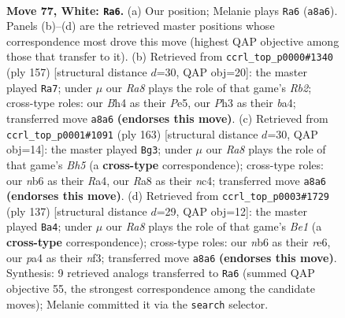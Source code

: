 \documentclass[11pt]{article}
\begin{document}
\clearpage

\begin{figure}[p]\centering
\begin{subfigure}{0.46\textwidth}\centering
\resizebox{\linewidth}{!}{%
\newchessgame
\chessboard[
  setfen={R7/6k1/1n6/3r4/p4P1B/P6P/6K1/8 w - - 9 77},
  showmover=false,
  pgfstyle=straightmove, color=movearrow, markmove={a8-a6}
]}
\caption{}
\end{subfigure}\hfill
\begin{subfigure}{0.46\textwidth}\centering
\resizebox{\linewidth}{!}{%
\newchessgame
\chessboard[
  setfen={7k/1r6/3N4/2p1p3/B1P3pP/6P1/8/7K b - - 0 79},
  showmover=false,
  pgfstyle=straightmove, color=movearrow, markmove={b7-a7}
]}
\caption{}
\end{subfigure}
\\[4pt]
\begin{subfigure}{0.46\textwidth}\centering
\resizebox{\linewidth}{!}{%
\newchessgame
\chessboard[
  setfen={5k2/8/8/3K1p1p/r1N4b/5P2/P6R/8 b - - 1 82},
  showmover=false,
  pgfstyle=straightmove, color=movearrow, markmove={h4-g3}
]}
\caption{}
\end{subfigure}\hfill
\begin{subfigure}{0.46\textwidth}\centering
\resizebox{\linewidth}{!}{%
\newchessgame
\chessboard[
  setfen={1k2b2r/1p5P/4R3/3p4/8/5NK1/8/8 b - - 6 69},
  showmover=false,
  pgfstyle=straightmove, color=movearrow, markmove={e8-a4}
]}
\caption{}
\end{subfigure}
\caption{\textbf{Move 77, White: \texttt{Ra6}.} (a) Our position; Melanie plays \texttt{Ra6} (\texttt{a8a6}). Panels (b)--(d) are the retrieved master positions whose correspondence most drove this move (highest QAP objective among those that transfer to it). (b) Retrieved from \texttt{ccrl\_top\_p0000\#1340} (ply 157) [structural distance $d$=30, QAP obj=20]: the master played \texttt{Ra7}; under $\mu$ our \emph{Ra8} plays the role of that game's \emph{Rb2}; cross-type roles: our \emph{B}h4 as their \emph{P}e5, our \emph{P}h3 as their \emph{b}a4; transferred move \texttt{a8a6} \textbf{(endorses this move)}. (c) Retrieved from \texttt{ccrl\_top\_p0001\#1091} (ply 163) [structural distance $d$=30, QAP obj=14]: the master played \texttt{Bg3}; under $\mu$ our \emph{Ra8} plays the role of that game's \emph{Bh5} (a \textbf{cross-type} correspondence); cross-type roles: our \emph{n}b6 as their \emph{R}a4, our \emph{R}a8 as their \emph{n}c4; transferred move \texttt{a8a6} \textbf{(endorses this move)}. (d) Retrieved from \texttt{ccrl\_top\_p0003\#1729} (ply 137) [structural distance $d$=29, QAP obj=12]: the master played \texttt{Ba4}; under $\mu$ our \emph{Ra8} plays the role of that game's \emph{Be1} (a \textbf{cross-type} correspondence); cross-type roles: our \emph{n}b6 as their \emph{r}e6, our \emph{p}a4 as their \emph{n}f3; transferred move \texttt{a8a6} \textbf{(endorses this move)}. Synthesis: 9 retrieved analogs transferred to \texttt{Ra6} (summed QAP objective 55, the strongest correspondence among the candidate moves); Melanie committed it via the \texttt{search} selector.}
\label{fig:thought-m152}
\end{figure}
\end{document}
